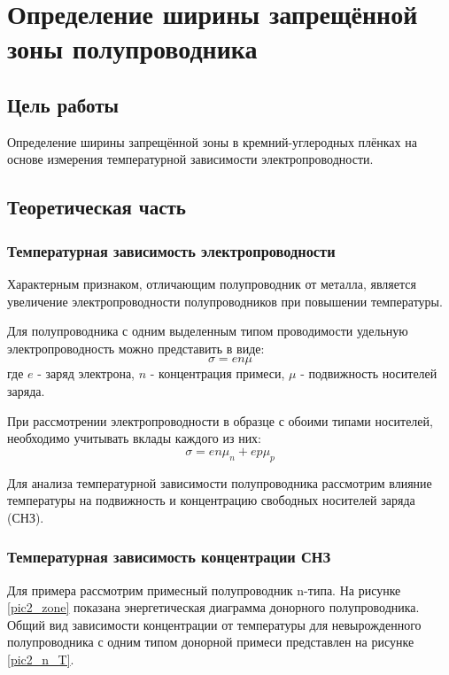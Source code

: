 \chapter{Определение ширины запрещённой зоны полупроводника}

\section{Цель работы}
Определение ширины запрещённой зоны в кремний-углеродных плёнках на основе измерения температурной зависимости электропроводности.

\section{Теоретическая часть}
\subsection{Температурная зависимость электропроводности}

Характерным признаком, отличающим полупроводник от металла, является увеличение электропроводности полупроводников при повышении температуры.

Для полупроводника с одним выделенным типом проводимости удельную электропроводность можно представить в виде:
\begin{equation}
\sigma = e n \mu
\end{equation}
где $e$ - заряд электрона, $n$ - концентрация примеси, $\mu$ - подвижность носителей заряда.

При рассмотрении электропроводности в образце с обоими типами носителей, необходимо учитывать вклады каждого из них:
\begin{equation}
\sigma = e n \mu_{n} + e p \mu_{p}
\end{equation}

Для анализа температурной зависимости полупроводника рассмотрим влияние температуры на подвижность и концентрацию свободных носителей заряда (СНЗ).

\subsection{Температурная зависимость концентрации СНЗ}

Для примера рассмотрим примесный полупроводник n-типа. На рисунке \ref{pic2_zone} показана энергетическая диаграмма донорного полупроводника. Общий вид зависимости концентрации от температуры для невырожденного полупроводника с одним типом донорной примеси представлен на рисунке \ref{pic2_n_T}.

